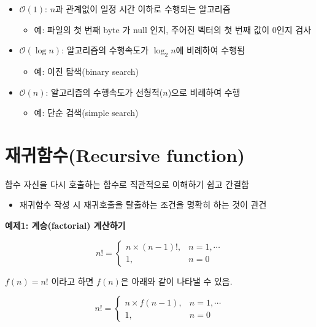 \documentclass[
  11pt,
]{krantz}
\providecommand{\tightlist}{%
  \setlength{\itemsep}{0pt}\setlength{\parskip}{0pt}}
\begin{document}
\begin{itemize}
\tightlist
\item
  \(\mathcal{O}(1)\): \(n\)과 관계없이 일정 시간 이하로 수행되는 알고리즘

  \begin{itemize}
  \tightlist
  \item
    예: 파일의 첫 번째 byte 가 null 인지, 주어진 벡터의 첫 번째 값이 0인지 검사
  \end{itemize}
\item
  \(\mathcal{O}(\log n)\): 알고리즘의 수행속도가 \(\log_2 n\)에 비례하여 수행됨

  \begin{itemize}
  \tightlist
  \item
    예: 이진 탐색(binary search)
  \end{itemize}
\item
  \(\mathcal{O}(n)\): 알고리즘의 수행속도가 선형적(\(n\))으로 비례하여 수행

  \begin{itemize}
  \tightlist
  \item
    예: 단순 검색(simple search)
  \end{itemize}
\end{itemize}

\hypertarget{uxc7acuxadc0uxd568uxc218recursive-function}{%
\section{재귀함수(Recursive function)}\label{uxc7acuxadc0uxd568uxc218recursive-function}}

함수 자신을 다시 호출하는 함수로 직관적으로 이해하기 쉽고 간결함

\begin{itemize}
\tightlist
\item
  재귀함수 작성 시 재귀호출을 탈출하는 조건을 명확히 하는 것이 관건
\end{itemize}

\textbf{예제1: 계승(factorial) 계산하기}

\[
 n! = \begin{cases}
 n \times (n - 1)!, & n=1, \cdots \\
 1, & n = 0
 \end{cases}
\]

\(f(n) = n!\) 이라고 하면 \(f(n)\)은 아래와 같이 나타낼 수 있음.

\[
 n! = \begin{cases}
 n \times f(n-1), & n=1, \cdots \\
 1, & n = 0
 \end{cases}
\]
\end{document}
